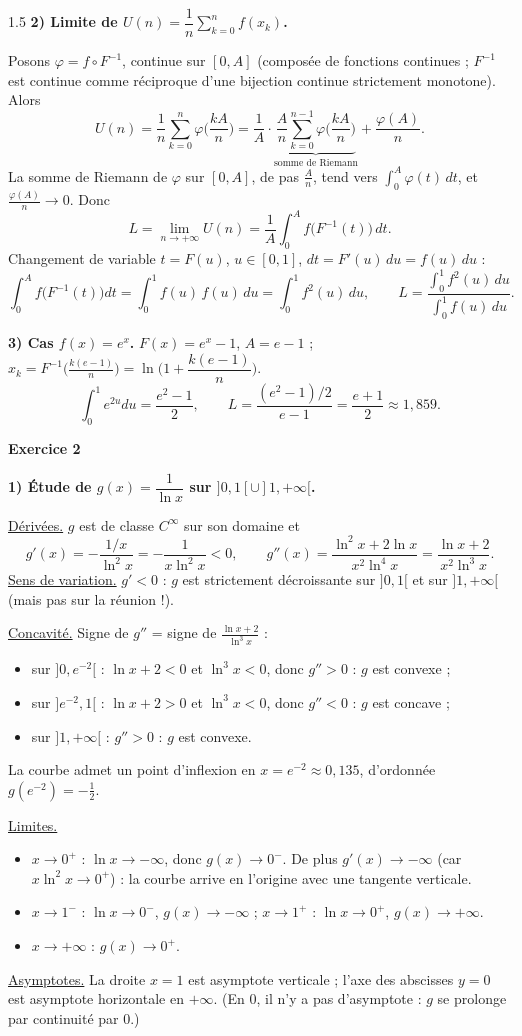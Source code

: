 \documentclass[12pt]{article}
\begin{document}
\begin{spacing}{1.5}
\textbf{2) Limite de $U(n)=\dfrac1n\displaystyle\sum_{k=0}^nf(x_k)$.}

Posons $\varphi=f\circ F^{-1}$, continue sur $[0,A]$ (composée de fonctions continues ; $F^{-1}$ est continue comme réciproque d'une bijection continue strictement monotone). Alors
\[
U(n)=\frac1n\sum_{k=0}^n\varphi\Big(\frac{kA}{n}\Big)=\frac1A\cdot\underbrace{\frac An\sum_{k=0}^{n-1}\varphi\Big(\frac{kA}{n}\Big)}_{\text{somme de Riemann}}+\frac{\varphi(A)}{n}.
\]
La somme de Riemann de $\varphi$ sur $[0,A]$, de pas $\frac An$, tend vers $\displaystyle\int_0^A\varphi(t)\,dt$, et $\frac{\varphi(A)}n\to0$. Donc
\[
L=\lim_{n\to+\infty}U(n)=\frac1A\int_0^Af\big(F^{-1}(t)\big)\,dt .
\]
Changement de variable $t=F(u)$, $u\in[0,1]$, $dt=F'(u)\,du=f(u)\,du$ :
\[
\int_0^Af\big(F^{-1}(t)\big)dt=\int_0^1f(u)\,f(u)\,du=\int_0^1f^2(u)\,du,\qquad\boxed{L=\frac{\displaystyle\int_0^1f^2(u)\,du}{\displaystyle\int_0^1f(u)\,du}}.
\]

\textbf{3) Cas $f(x)=e^x$.} $F(x)=e^x-1$, $A=e-1$ ; $x_k=F^{-1}\big(\frac{k(e-1)}{n}\big)=\ln\Big(1+\dfrac{k(e-1)}{n}\Big)$.
\[
\int_0^1e^{2u}du=\frac{e^2-1}{2},\qquad L=\frac{(e^2-1)/2}{e-1}=\boxed{\frac{e+1}{2}\approx1{,}859}.
\]

\medskip\textbf{Exercice 2}

\textbf{1) Étude de $g(x)=\dfrac1{\ln x}$ sur $]0,1[\cup]1,+\infty[$.}

\underline{Dérivées.} $g$ est de classe $C^\infty$ sur son domaine et
\[
g'(x)=-\frac{1/x}{\ln^2x}=-\frac{1}{x\ln^2x}<0,\qquad g''(x)=\frac{\ln^2x+2\ln x}{x^2\ln^4x}=\frac{\ln x+2}{x^2\ln^3x}.
\]
\underline{Sens de variation.} $g'<0$ : $g$ est strictement décroissante sur $]0,1[$ et sur $]1,+\infty[$ (mais pas sur la réunion !).

\underline{Concavité.} Signe de $g''$ = signe de $\frac{\ln x+2}{\ln^3x}$ :
\begin{itemize}
\item sur $]0,e^{-2}[$ : $\ln x+2<0$ et $\ln^3x<0$, donc $g''>0$ : $g$ est convexe ;
\item sur $]e^{-2},1[$ : $\ln x+2>0$ et $\ln^3x<0$, donc $g''<0$ : $g$ est concave ;
\item sur $]1,+\infty[$ : $g''>0$ : $g$ est convexe.
\end{itemize}
La courbe admet un point d'inflexion en $x=e^{-2}\approx0{,}135$, d'ordonnée $g(e^{-2})=-\frac12$.

\underline{Limites.}
\begin{itemize}
\item $x\to0^+$ : $\ln x\to-\infty$, donc $g(x)\to0^-$. De plus $g'(x)\to-\infty$ (car $x\ln^2x\to0^+$) : la courbe arrive en l'origine avec une tangente verticale.
\item $x\to1^-$ : $\ln x\to0^-$, $g(x)\to-\infty$ ; \quad $x\to1^+$ : $\ln x\to0^+$, $g(x)\to+\infty$.
\item $x\to+\infty$ : $g(x)\to0^+$.
\end{itemize}
\underline{Asymptotes.} La droite $x=1$ est asymptote verticale ; l'axe des abscisses $y=0$ est asymptote horizontale en $+\infty$. (En $0$, il n'y a pas d'asymptote : $g$ se prolonge par continuité par $0$.)


\end{spacing}
\end{document}

